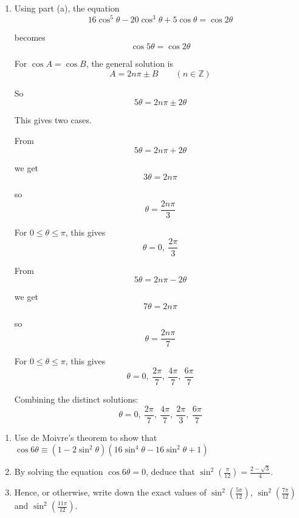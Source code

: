 \documentclass[leqno]{article}
\begin{document}
\begin{enumerate}[
  label=\textbf{\arabic*.},
  leftmargin=*,
  topsep=0pt,
  partopsep=0pt,
  parsep=0pt
]
\begin{djsSolution}
\begin{enumerate}[label=\textbf{(\alph*)}]
  \item Using part (a), the equation
\[
16\cos^5\theta-20\cos^3\theta+5\cos\theta=\cos 2\theta
\]

becomes
\[
\cos 5\theta=\cos 2\theta
\]

For \(\cos A=\cos B\), the general solution is
\[
A=2n\pi\pm B \qquad (n\in\mathbb{Z})
\]

So
\[
5\theta=2n\pi\pm 2\theta
\]

This gives two cases.

\medskip

From
\[
5\theta=2n\pi+2\theta
\]

we get
\[
3\theta=2n\pi
\]

so
\[
\theta=\frac{2n\pi}{3}
\]

For \(0\le \theta\le \pi\), this gives
\[
\theta=0,\ \frac{2\pi}{3}
\]

\medskip

From
\[
5\theta=2n\pi-2\theta
\]

we get
\[
7\theta=2n\pi
\]

so
\[
\theta=\frac{2n\pi}{7}
\]

For \(0\le \theta\le \pi\), this gives
\[
\theta=0,\ \frac{2\pi}{7},\ \frac{4\pi}{7},\ \frac{6\pi}{7}
\]

Combining the distinct solutions:
\[
\theta=0,\ \frac{2\pi}{7},\ \frac{4\pi}{7},\ \frac{2\pi}{3},\ \frac{6\pi}{7}
\]
\end{enumerate}
\end{djsSolution}


\newpage

\questionitem

\begin{enumerate}[label=\textbf{(\alph*)}]
  \item Use de Moivre's theorem to show that $\cos 6\theta \equiv (1 - 2\sin^2\theta)(16\sin^4\theta - 16\sin^2\theta + 1)$  \\
  \item By solving the equation $\cos 6\theta = 0$, deduce that $\sin^2\left(\frac{\pi}{12}\right) = \frac{2 - \sqrt{3}}{4}$.  \\
  \item Hence, or otherwise, write down the exact values of $\sin^2\left(\frac{5\pi}{12}\right)$, $\sin^2\left(\frac{7\pi}{12}\right)$ and $\sin^2\left(\frac{11\pi}{12}\right)$.  \\
\end{enumerate}


\end{enumerate}
\end{document}
